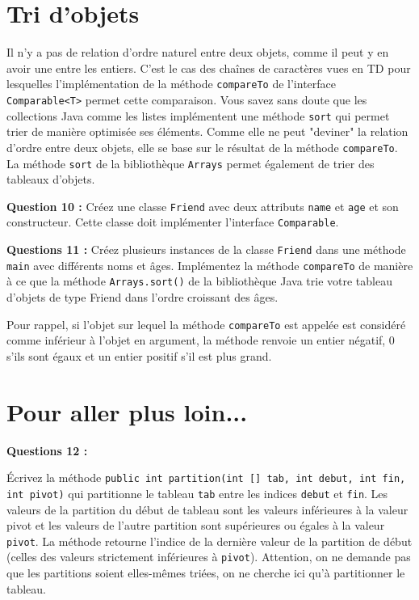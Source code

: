 \documentclass[iutinfo,a4paper,10pt]{ustl-tdtp}
\begin{document}
\section{Tri d'objets}

Il n'y a pas de relation d'ordre naturel entre deux objets, comme il peut y en avoir une entre les entiers. C'est le cas des chaînes de caractères vues en TD pour lesquelles l'implémentation  de la méthode \texttt{compareTo} de l'interface \texttt{Comparable<T>} permet cette comparaison.
Vous savez sans doute que les collections Java comme les listes implémentent une méthode \texttt{sort} qui permet trier de manière optimisée ses éléments. Comme elle ne peut "deviner" la relation d'ordre entre deux objets, elle se base sur le résultat de la méthode \texttt{compareTo}. La méthode \texttt{sort} de la bibliothèque \texttt{Arrays} permet également de trier des tableaux d'objets.\newline

\textbf{Question 10 : }\newline
Créez une classe \texttt{Friend} avec deux attributs \texttt{name} et \texttt{age} et son constructeur. Cette classe doit implémenter l'interface \texttt{Comparable}.\newline

\textbf{Questions 11 : }\newline
Créez plusieurs instances de la classe \texttt{Friend} dans une méthode \texttt{main} avec différents noms et âges. Implémentez la méthode \texttt{compareTo} de manière à ce que la méthode \texttt{Arrays.sort()} de la bibliothèque Java trie votre tableau d'objets de type Friend dans l'ordre croissant des âges.\newline

Pour rappel, si l'objet sur lequel la méthode \texttt{compareTo} est appelée est considéré comme inférieur à l'objet en argument, la méthode renvoie un entier négatif, 0 s'ils sont égaux et un entier positif s'il est plus grand.


\section{Pour aller plus loin...}
\textbf{Questions 12 : }\newline

Écrivez la méthode \texttt{public int partition(int [] tab, int debut, int fin, int pivot)} qui partitionne le tableau  \texttt{tab} entre les indices \texttt{debut} et \texttt{fin}. Les valeurs de la partition du début de tableau sont les valeurs inférieures à la valeur pivot et les valeurs de l'autre partition  sont supérieures ou égales à la valeur \texttt{pivot}. La méthode retourne l'indice de la dernière valeur de la partition de début (celles des valeurs strictement inférieures à \texttt{pivot}).
Attention, on ne demande pas que les partitions soient elles-mêmes triées, on ne cherche ici qu'à partitionner le tableau.\newline
\end{document}
